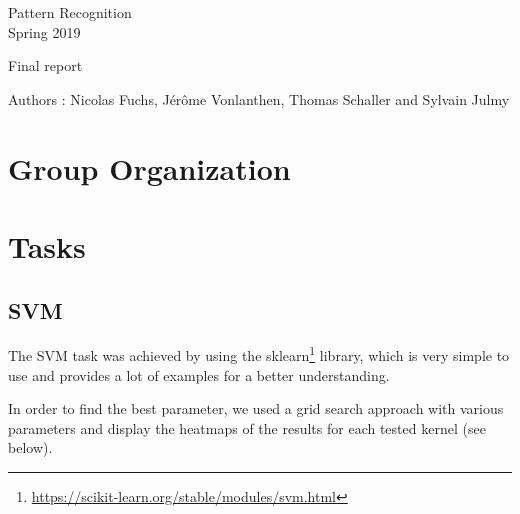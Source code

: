 \documentclass[a4paper,11pt]{report}
\date{\today}
\begin{document}
\begin{center}
  \large{
    Pattern Recognition\\
    Spring 2019
  }
  
  \noindent\makebox[\linewidth]{\rule{\linewidth}{0.4pt}}
  Final report
  \noindent\makebox[\linewidth]{\rule{\linewidth}{0.4pt}}

  \begin{flushleft}
    Authors : Nicolas Fuchs, Jérôme Vonlanthen, Thomas Schaller and Sylvain Julmy
  \end{flushleft}
  
  \noindent\makebox[\linewidth]{\rule{\textwidth}{1pt}}
\end{center}

\section*{Group Organization}

\section*{Tasks}

\subsection*{SVM}

The SVM task was achieved by using the
sklearn\footnote{\url{https://scikit-learn.org/stable/modules/svm.html}}
library, which is very simple to use and provides a lot of examples for a better
understanding.

In order to find the best parameter, we used a grid search approach with various
parameters and display the heatmaps of the results for each tested kernel (see below).
\end{document}

